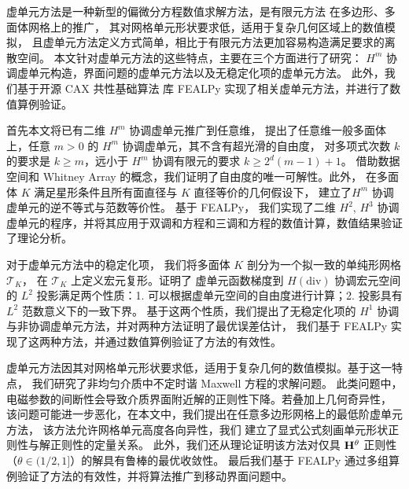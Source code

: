 ﻿%
\begin{cnabstract}

虚单元方法是一种新型的偏微分方程数值求解方法，是有限元方法
在多边形、多面体网格上的推广，
其对网格单元形状要求低，适用于复杂几何区域上的数值模拟，
且虚单元方法定义方式简单，相比于有限元方法更加容易构造满足要求的离散空间。
本文针对虚单元方法的这些特点，主要在三个方面进行了研究：
 $H^m$ 协调虚单元构造，界面问题的虚单元方法以及无稳定化项的虚单元方法。
此外，我们基于开源 CAX 共性基础算法
库 FEALPy 实现了相关虚单元方法，并进行了数值算例验证。

首先本文将已有二维 $H^m$ 协调虚单元推广到任意维，
提出了任意维一般多面体上，任意 $m > 0$ 的 $H^m$ 协调虚单元，其不含有超光滑的自由度，
对多项式次数 $k$ 的要求是 $k \geq m$，远小于 $H^m$ 协调有限元的要求 $k \geq
2^{d}(m-1)+1$。
借助数据空间和 Whitney Array 的概念，我们证明了自由度的唯一可解性。此外，
在多面体 $K$ 满足星形条件且所有面直径与 $K$ 直径等价的几何假设下，
建立了$H^m$ 协调虚单元的逆不等式与范数等价性。
基于 FEALPy，
我们实现了二维 $H^2$, $H^3$
协调虚单元的程序，并将其应用于双调和方程和三调和方程的数值计算，数值结果验证了理论分析。

对于虚单元方法中的稳定化项，
我们将多面体 $K$ 剖分为一个拟一致的单纯形网格 $\mathcal{T}_K$，
在 $\mathcal{T}_K$ 上定义宏元复形。证明了
虚单元函数梯度到 $H(\mathrm{div})$ 协调宏元空间的 $L^2$
投影满足两个性质：1. 可以根据虚单元空间的自由度进行计算；2. 投影具有
$L^2$ 范数意义下的一致下界。
基于这两个性质，我们提出了无稳定化项的 $H^1$
协调与非协调虚单元方法，并对两种方法证明了最优误差估计，
我们基于 FEALPy 实现了这两种方法，并通过数值算例验证了方法的有效性。

虚单元方法因其对网格单元形状要求低，适用于复杂几何的数值模拟。基于这一特点，
我们研究了非均匀介质中不定时谐 Maxwell 方程的求解问题。
此类问题中，
电磁参数的间断性会导致介质界面附近解的正则性下降。若叠加上几何奇异性，
该问题可能进一步恶化，在本文中，我们提出在任意多边形网格上的最低阶虚单元方法，
该方法允许网格单元高度各向异性，我们
建立了显式公式刻画单元形状正则性与解正则性的定量关系。
此外，我们还从理论证明该方法对仅具 
$\mathbf{H}^{\theta}$ 正则性（$\theta\in(1/2,1]$）的解具有鲁棒的最优收敛性。
最后我们基于 FEALPy
通过多组算例验证了方法的有效性，并将算法推广到移动界面问题中。

\end{cnabstract}


